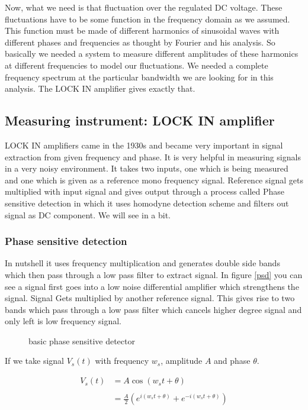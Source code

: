 \documentclass[12pt]{article}
\begin{document}
Now, what we need is that fluctuation over the regulated DC voltage. These fluctuations have to be some function in the frequency domain as we assumed. This function must be made of different harmonics of sinusoidal waves with different phases and frequencies as thought by Fourier and his analysis. So basically we needed a system to measure different amplitudes of these harmonics at different frequencies to model our fluctuations. We needed a complete frequency spectrum at the particular bandwidth we are looking for in this analysis. The LOCK IN amplifier gives exactly that. 


\subsection{Measuring instrument: LOCK IN amplifier}

LOCK IN amplifiers came in the 1930s and became very important in signal extraction from given frequency and phase. It is very helpful in measuring signals in a very noisy environment. It takes two inputs, one which is being measured and one which is given as a reference mono frequency signal. Reference signal gets multiplied with input signal and gives output through a process called Phase sensitive detection in which it uses homodyne detection scheme and filters out signal as DC component. We will see in a bit.

\subsubsection{Phase sensitive detection}

In nutshell it uses frequency multiplication and generates double side bands which then pass through a low pass filter to extract signal. In figure \ref{psd} you can see a signal first goes into a low noise differential amplifier which strengthens the signal. Signal Gets multiplied by another reference signal. This gives rise to two bands which pass through a low pass filter which cancels higher degree signal and only left is low frequency signal.


\begin{figure}[hbt!]
\caption{basic phase sensitive detector}
\end{figure}

If we take signal $V_s(t)$ with frequency $w_s$, amplitude $A$ and phase $\theta$. 

\begin{align*}
V_{s}(t) & = A \cos(w_st+\theta)\\
\\
& = \frac{A}{2} (e^{i(w_st+\theta)}+e^{-i(w_st+\theta)})\\
\end{align*}
\end{document}
